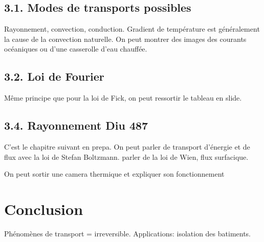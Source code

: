 \documentclass[french, a4paper, 10pt, twocolumn, landscape]{article}
\begin{document}
\subsection*{3.1. Modes de transports possibles}

Rayonnement, convection, conduction. Gradient de température est généralement la cause de la convection naturelle. On peut montrer des images des courants océaniques ou d'une casserolle d'eau chauffée.

\subsection*{3.2. Loi de Fourier}

Même principe que pour la loi de Fick, on peut ressortir le tableau en slide.




\subsection*{3.4. Rayonnement Diu 487}
C'est le chapitre suivant en prepa. On peut parler de transport d'énergie et de flux avec la loi de Stefan Boltzmann. parler de la loi de Wien, flux surfacique. 


On peut sortir une camera thermique et expliquer son fonctionnement


\section*{Conclusion}

Phénomènes de transport = irreversible. Applications: isolation des batiments. 
\end{document}
